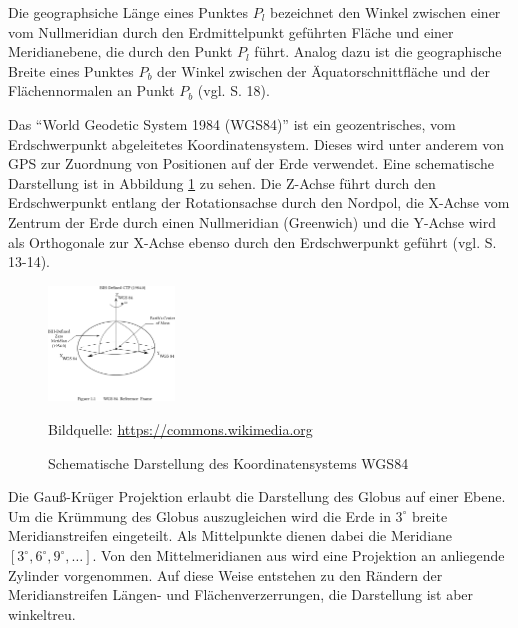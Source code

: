 Die geographsiche Länge eines Punktes $P_l$ bezeichnet den Winkel zwischen einer vom Nullmeridian durch den Erdmittelpunkt geführten Fläche und einer Meridianebene, die durch den Punkt $P_l$ führt.
Analog dazu ist die geographische Breite eines Punktes $P_b$ der Winkel zwischen der Äquatorschnittfläche und der Flächennormalen an Punkt $P_b$ (vgl.  \cite{witte2011vermessungskunde} S. 18).


Das "`World Geodetic System 1984 (WGS84)"' ist ein geozentrisches, vom Erdschwerpunkt abgeleitetes Koordinatensystem. Dieses wird unter anderem von GPS zur Zuordnung von Positionen auf der Erde verwendet. Eine schematische Darstellung ist in Abbildung \ref{fig:wgs84} zu sehen. Die  Z-Achse führt durch den Erdschwerpunkt entlang der Rotationsachse durch den Nordpol, die X-Achse vom Zentrum der Erde durch einen Nullmeridian (Greenwich) und die Y-Achse wird als Orthogonale zur X-Achse ebenso durch den Erdschwerpunkt geführt (vgl. \cite{witte2011vermessungskunde} S. 13-14).


\begin{figure}[h!]
 \centering
 \includegraphics[width=0.3\textwidth, trim={0 9cm 0 3cm},clip]{pix/WGS_84_reference_frame.png}
 \caption[Schematische Darstellung des Koordinatensystems WGS84]
 {Schematische Darstellung des Koordinatensystems WGS84}
 \footnotesize{
    Bildquelle: \href{https://commons.wikimedia.org/wiki/File:WGS_84_reference_frame_(vector_graphic).svg}
                {\url{https://commons.wikimedia.org}}
 }
 \label{fig:wgs84}
\end{figure}



Die Gauß-Krüger Projektion erlaubt die Darstellung des Globus auf einer Ebene. Um die Krümmung des Globus auszugleichen wird die Erde in $3^\circ$ breite Meridianstreifen eingeteilt. Als Mittelpunkte dienen dabei die Meridiane $[ 3^\circ, 6^\circ, 9^\circ, \dots]$. Von den Mittelmeridianen aus wird eine Projektion an anliegende Zylinder vorgenommen. Auf diese Weise entstehen zu den Rändern der Meridianstreifen Längen- und Flächenverzerrungen, die Darstellung ist aber winkeltreu.
\\

